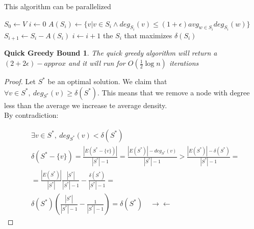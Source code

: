 \documentclass[]{article}
\begin{document}
This algorithm can be parallelized
\begin{algorithm}[H]
	\caption{Quick-Greedy-Subgraph( graph: G)}
	\label{alg:quick-sub-greedy}
	\begin{algorithmic}
		\STATE $S_0 \leftarrow V$
		\STATE $ i\leftarrow 0 $
		\STATE $ A(S_i) \leftarrow \{v|v\in S_i \wedge deg_{S_i}(v) \leq (1+\epsilon)avg_{w\in S_i} deg_{S_i}(w) \} $
		\STATE $ S_{i+1} \leftarrow S_i - A(S_i) $
		\STATE $ i \leftarrow i+1 $
		\ENDWHILE
		\RETURN the $S_i$ that maximizes $\delta(S_i)$
	\end{algorithmic}
\end{algorithm}

\newtheorem{quickgreedy}{Quick Greedy Bound}

\begin{quickgreedy}
	The quick greedy algorithm will return a $ (2+2\epsilon)-approx $ and it will run for $ O\left(\frac{1}{2}\log n\right) $ iterations
\end{quickgreedy}

\begin{proof}
	Let $ S^* $ be an optimal solution. We claim that $ \forall v \in S^*,\ deg_{S^*}(v) \geq \delta(S^*) $. This means that we remove a node with degree less than the average we increase te average density.\\
	
	By contradiction:
	
	\begin{align*}
		&\exists v \in S^*,\ deg_{S^*}(v) < \delta(S^*)\\
		&\delta(S^* - \{v\}) = \frac{|E(S^* - \{v\})|}{|S^*| -1} =  \frac{|E(S^*)| - deg_{S^*}(v)}{|S^*| -1} > \frac{|E(S^*)| - \delta(S^*)}{|S^*| -1}=\\
		&=\frac{|E(S^*)|}{|S^*|} \frac{|S^*|}{|S^*| -1} - \frac{\delta(S^*)}{|S^*| -1}=\\
		&\delta(S^*)\left(\frac{|S^*|}{|S^*| -1} - \frac{1}{|S^*| -1}\right) = \delta(S^*)\quad \rightarrow\!\leftarrow
	\end{align*}
\end{proof}
\end{document}
